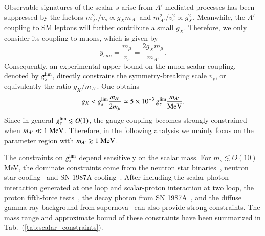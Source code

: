 \documentclass[onecolumn, aps, nofootinbib, prd, preprint, floats, floatfix, amsmath, amssymb, superscriptaddress, preprintnumbers]{revtex4-1}
\begin{document}
Observable signatures of the scalar $s$ arise from $A'$-mediated processes has been suppressed by the factors $m_{A'}^2/v_s \propto g_X m_{A'}$ and $m_{A'}^2/v_s^2 \propto g^2_X$. Meanwhile, the $A'$ coupling to SM leptons will further contribute a small $g_X$. Therefore, we only consider its coupling to muons, which is given by
\begin{equation}
y_{s\mu\mu}=\frac{m_\mu}{v_s}
=\frac{2g_Xm_\mu}{m_{A'}}.
\end{equation}
Consequently, an experimental upper bound on the muon-scalar coupling, denoted by $g_s^{\rm lim}$, directly constrains the symmetry-breaking scale $v_s$, or equivalently the ratio $g_X/m_{A'}$. One obtains
\begin{equation}
g_X<g_s^{\rm lim}\frac{m_{A'}}{2m_\mu}
\simeq
5\times10^{-3}
\,g_s^{\rm lim}
\frac{m_{A'}}{\rm MeV}.
\end{equation}
Since in general $g_s^{\rm lim}\lesssim O(1)$, the gauge coupling becomes strongly constrained when
$m_{A'}\ll1~{\rm MeV}$.
Therefore, in the following analysis we mainly focus on the parameter region with
$m_{A'}\gtrsim1~{\rm MeV}$.

The constraints on $g_s^{\rm lim}$ depend sensitively on the scalar mass.
For $m_s \lesssim O(10)$ MeV, the dominate constraints come from the neutron star binaries~\cite{Dror:2019uea, Liu:2025zuz}, neutron star cooling~\cite{Fiorillo:2026wso} and SN 1987A cooling~\cite{Caputo:2021rux, Balazs:2022tjl}. After including the scalar-photon interaction generated at one loop and scalar-proton interaction at two loop, the proton fifth-force tests~\cite{Hoskins:1985tn, Smith:1999cr, Kapner:2006si, Geraci:2008hb, Sushkov:2011md, Yang:2012zzb, Chen:2014oda, Decca:2007yb, Blakemore:2021zna, Venugopalan:2024kgu, Chiu:2009fqu, Bezerra:2010pq, Banishev:2012kkb, Banishev:2014jka, Berge:2017ovy, Lee:2020zjt, Tan:2020vpf, Matias:2025vrq, Boynewicz:2025daj, Ren:2026hff, Fiorillo:2026wso}, the decay photon from SN 1987A~\cite{Caputo:2021rux, Balazs:2022tjl}, and the diffuse gamma ray background from supernova~\cite{Caputo:2021rux, Balazs:2022tjl} can also provide strong constraints. The mass range and approximate bound of these constraints have been summarized in Tab.~(\ref{tab:scalar_constraints}). 
\end{document}
